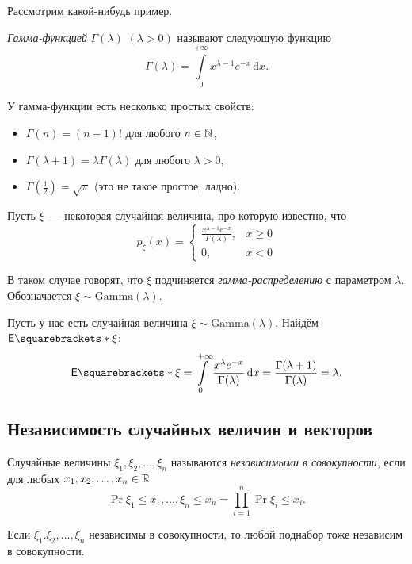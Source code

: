 Рассмотрим какой-нибудь пример.
\begin{definition}
	\emph{Гамма-функцией} \(\Gamma(\lambda)\) \((\lambda > 0)\) называют следующую функцию
	\[\Gamma(\lambda) = \int\limits_{0}^{+\infty} x^{\lambda - 1}e^{-x}\,\mathrm{d}x.\]
\end{definition}

У гамма-функции есть несколько простых свойств:
\begin{itemize}
	\item \(\Gamma(n) = (n - 1)!\) для любого \(n \in \mathbb{N}\),
	\item \(\Gamma(\lambda + 1) = \lambda\Gamma(\lambda)\) для любого \(\lambda > 0\),
	\item \(\Gamma\left(\frac{1}{2}\right) = \sqrt{\pi}\) (это не такое простое, ладно).
\end{itemize}

\begin{definition}
	Пусть \(\xi\)~--- некоторая случайная величина, про которую известно, что
	\[
	p_{\xi}(x) = \begin{cases}
	\frac{x^{\lambda - 1}e^{-x}}{\Gamma(\lambda)},& x \geq 0 \\
	0,& x < 0
	\end{cases}
	\]
	
	В таком случае говорят, что \(\xi\) подчиняется \emph{гамма-распределению} с параметром \(\lambda\). Обозначается \(\xi \sim \mathrm{Gamma}(\lambda)\).
\end{definition}

Пусть у нас есть случайная величина \(\xi \sim \mathrm{Gamma}(\lambda)\). Найдём \(\E{\xi}\):
\[
\E{\xi} = \int\limits_{0}^{+\infty} \frac{x^{\lambda}e^{-x}}{\Gamma(\lambda)}\,\mathrm{d}x = \frac{\Gamma(\lambda + 1)}{\Gamma(\lambda)} = \lambda.
\]

\subsection{Независимость случайных величин и векторов}

\begin{definition}
	Случайные величины \(\xi_1, \xi_2, \dots, \xi_n\) называются \emph{независимыми в совокупности}, если для любых \(x_1, x_2, \dots, x_n \in \mathbb{R}\) 
	\[
	\Pr{\xi_1 \leq x_1, \dots, \xi_n \leq x_n} = \prod\limits_{i = 1}^{n} \Pr{\xi_i \leq x_i}.
	\] 
\end{definition}
\begin{remark}
	Если \(\xi_1. \xi_2, \dots, \xi_n\) независимы в совокупности, то любой поднабор тоже независим в совокупности.
\end{remark}

